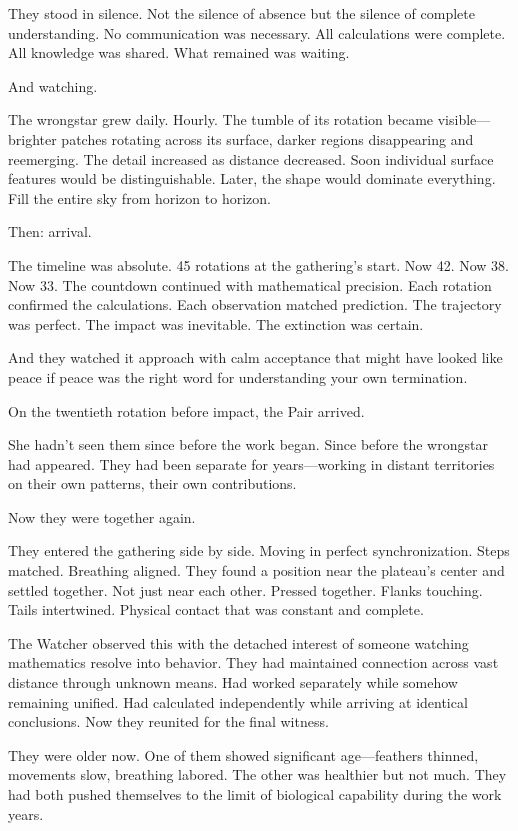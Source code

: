 They stood in silence. Not the silence of absence but the silence of complete understanding. No communication was necessary. All calculations were complete. All knowledge was shared. What remained was waiting.

And watching.

The wrongstar grew daily. Hourly. The tumble of its rotation became visible—brighter patches rotating across its surface, darker regions disappearing and reemerging. The detail increased as distance decreased. Soon individual surface features would be distinguishable. Later, the shape would dominate everything. Fill the entire sky from horizon to horizon.

Then: arrival.

The timeline was absolute. 45 rotations at the gathering's start. Now 42. Now 38. Now 33. The countdown continued with mathematical precision. Each rotation confirmed the calculations. Each observation matched prediction. The trajectory was perfect. The impact was inevitable. The extinction was certain.

And they watched it approach with calm acceptance that might have looked like peace if peace was the right word for understanding your own termination.

\scenebreak

On the twentieth rotation before impact, the Pair arrived.

She hadn't seen them since before the work began. Since before the wrongstar had appeared. They had been separate for years—working in distant territories on their own patterns, their own contributions.

Now they were together again.

They entered the gathering side by side. Moving in perfect synchronization. Steps matched. Breathing aligned. They found a position near the plateau's center and settled together. Not just near each other. Pressed together. Flanks touching. Tails intertwined. Physical contact that was constant and complete.

The Watcher observed this with the detached interest of someone watching mathematics resolve into behavior. They had maintained connection across vast distance through unknown means. Had worked separately while somehow remaining unified. Had calculated independently while arriving at identical conclusions. Now they reunited for the final witness.

They were older now. One of them showed significant age—feathers thinned, movements slow, breathing labored. The other was healthier but not much. They had both pushed themselves to the limit of biological capability during the work years.

